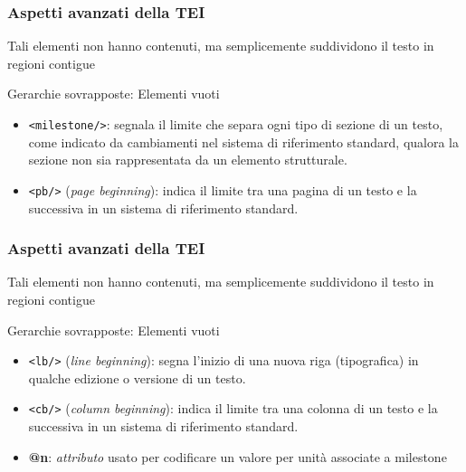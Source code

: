     \begin{frame}
        \frametitle{Aspetti avanzati della TEI}
        \addtocounter{nframe}{1}
        
        Tali elementi non hanno contenuti, ma semplicemente suddividono il testo in regioni contigue
        \begin{block}{Gerarchie sovrapposte: Elementi vuoti}
            \begin{itemize}
                \item \texttt{<milestone/>}: segnala il limite che separa ogni tipo di sezione di un testo, come indicato da cambiamenti nel sistema di riferimento standard, qualora la sezione non sia rappresentata da un elemento strutturale.
                \item \texttt{<pb/>} (\textit{page beginning}): indica il limite tra una pagina di un testo e la successiva in un sistema di riferimento standard.
            \end{itemize}
        \end{block}

    \end{frame}

    \begin{frame}
        \frametitle{Aspetti avanzati della TEI}
        \addtocounter{nframe}{1}
        
        Tali elementi non hanno contenuti, ma semplicemente suddividono il testo in regioni contigue
        \begin{block}{Gerarchie sovrapposte: Elementi vuoti}
            \begin{itemize}
                \item \texttt{<lb/>} (\textit{line beginning}): segna l'inizio di una nuova riga (tipografica) in qualche edizione o versione di un testo.
                \item \texttt{<cb/>} (\textit{column beginning}): indica il limite tra una colonna di un testo e la successiva in un sistema di riferimento standard.
                \item [] \textbf{@n}: \textit{attributo} usato per codificare un valore per unità associate a milestone
            \end{itemize}
        \end{block}

    \end{frame}


